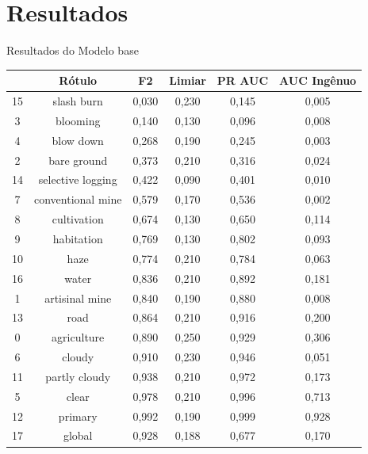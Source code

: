 \documentclass{beamer}
\begin{document}
\section{Resultados} 
\begin{frame}{Resultados do Modelo base}
    \fontsize{6pt}{7pt}\selectfont
    \begin{tabular}{*{6}{c}}
        \hline
        {} &              Rótulo &  F2    &  Limiar   &  PR AUC &  AUC Ingênuo \\
        \hline
        15 &         slash burn &  0,030 &      0,230 &   0,145 &       0,005 \\
        3  &           blooming &  0,140 &      0,130 &   0,096 &       0,008 \\
        4  &          blow down &  0,268 &      0,190 &   0,245 &       0,003 \\
        2  &        bare ground &  0,373 &      0,210 &   0,316 &       0,024 \\
        14 &  selective logging &  0,422 &      0,090 &   0,401 &       0,010 \\
        7  &  conventional mine &  0,579 &      0,170 &   0,536 &       0,002 \\
        8  &        cultivation &  0,674 &      0,130 &   0,650 &       0,114 \\
        9  &         habitation &  0,769 &      0,130 &   0,802 &       0,093 \\
        10 &               haze &  0,774 &      0,210 &   0,784 &       0,063 \\
        16 &              water &  0,836 &      0,210 &   0,892 &       0,181 \\
        1  &     artisinal mine &  0,840 &      0,190 &   0,880 &       0,008 \\
        13 &               road &  0,864 &      0,210 &   0,916 &       0,200 \\
        0  &        agriculture &  0,890 &      0,250 &   0,929 &       0,306 \\
        6  &             cloudy &  0,910 &      0,230 &   0,946 &       0,051 \\
        11 &      partly cloudy &  0,938 &      0,210 &   0,972 &       0,173 \\
        5  &              clear &  0,978 &      0,210 &   0,996 &       0,713 \\
        12 &            primary &  0,992 &      0,190 &   0,999 &       0,928 \\
        17 &             global &  0,928 &      0,188 &   0,677 &       0,170 \\
        \hline
    \end{tabular}    
\end{frame}  
\end{document}
